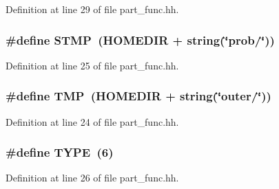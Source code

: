 Definition at line 29 of file part\+\_\+func.\+hh.

\hypertarget{part__func_8hh_a774a8dcd25e059751ce6342c7fdfd41e}{
\subsubsection[{S\+T\+M\+P}]{\setlength{\rightskip}{0pt plus 5cm}\#define S\+T\+M\+P~({\bf H\+O\+M\+E\+D\+I\+R} + string(\char`\"{}prob/\char`\"{}))}}\label{part__func_8hh_a774a8dcd25e059751ce6342c7fdfd41e}


Definition at line 25 of file part\+\_\+func.\+hh.

\hypertarget{part__func_8hh_a589ba3dc5e20290a35fb1e626372ef61}{
\subsubsection[{T\+M\+P}]{\setlength{\rightskip}{0pt plus 5cm}\#define T\+M\+P~({\bf H\+O\+M\+E\+D\+I\+R} + string(\char`\"{}outer/\char`\"{}))}}\label{part__func_8hh_a589ba3dc5e20290a35fb1e626372ef61}


Definition at line 24 of file part\+\_\+func.\+hh.

\hypertarget{part__func_8hh_a5a392548f2df67370cb15d2a5d75cd7b}{
\subsubsection[{T\+Y\+P\+E}]{\setlength{\rightskip}{0pt plus 5cm}\#define T\+Y\+P\+E~(6)}}\label{part__func_8hh_a5a392548f2df67370cb15d2a5d75cd7b}


Definition at line 26 of file part\+\_\+func.\+hh.

